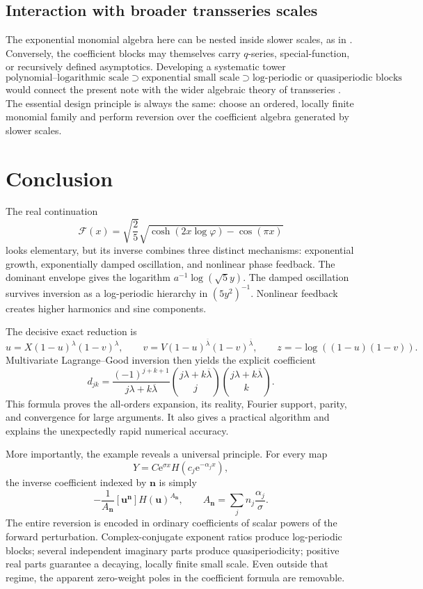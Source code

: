 \documentclass[11pt,oneside]{article}
\theoremstyle{plain}
\theoremstyle{definition}
\theoremstyle{remark}
\newcommand{\e}{\mathrm{e}}
\newcommand{\Fcal}{\mathcal{F}}
\newcommand{\phig}{\varphi}
\begin{document}
\subsection{Interaction with broader transseries scales}

The exponential monomial algebra here can be nested inside slower scales, as
in .  Conversely, the coefficient blocks may themselves
carry \(q\)-series, special-function, or recursively defined asymptotics.
Developing a systematic tower
\begin{equation}
 \text{polynomial--logarithmic scale}
 \supset
 \text{exponential small scale}
 \supset
 \text{log-periodic or quasiperiodic blocks}
 \label{eq:scale-tower}
\end{equation}
would connect the present note with the wider algebraic theory of transseries
\cite{vanderHoeven2006,Costin2009}.  The essential design principle is always
the same: choose an ordered, locally finite monomial family and perform
reversion over the coefficient algebra generated by slower scales.

\section{Conclusion}
\label{sec:conclusion}

The real continuation
\[
 \Fcal(x)=\sqrt{\frac25}
 \sqrt{\cosh(2x\log\phig)-\cos(\pi x)}
\]
looks elementary, but its inverse combines three distinct mechanisms:
exponential growth, exponentially damped oscillation, and nonlinear phase
feedback.  The dominant envelope gives the logarithm
\(a^{-1}\log(\sqrt5y)\).  The damped oscillation survives inversion as a
log-periodic hierarchy in \((5y^2)^{-1}\).  Nonlinear feedback creates higher
harmonics and sine components.

The decisive exact reduction is
\[
 u=X(1-u)^\lambda(1-v)^\lambda,
 \qquad
 v=V(1-u)^{\overline\lambda}(1-v)^{\overline\lambda},
 \qquad
 z=-\log((1-u)(1-v)).
\]
Multivariate Lagrange--Good inversion then yields the explicit coefficient
\[
 d_{jk}=\frac{(-1)^{j+k+1}}{j\lambda+k\overline\lambda}
 \binom{j\lambda+k\overline\lambda}{j}
 \binom{j\lambda+k\overline\lambda}{k}.
\]
This formula proves the all-orders expansion, its reality, Fourier support,
parity, and convergence for large arguments.  It also gives a practical
algorithm and explains the unexpectedly rapid numerical accuracy.

More importantly, the example reveals a universal principle.  For every map
\[
 Y=C\e^{\sigma x}H(c_j\e^{-\alpha_jx}),
\]
the inverse coefficient indexed by \(\bm n\) is simply
\[
 -\frac1{A_{\bm n}}[\bm u^{\bm n}]H(\bm u)^{A_{\bm n}},
 \qquad A_{\bm n}=\sum_jn_j\frac{\alpha_j}{\sigma}.
\]
The entire reversion is encoded in ordinary coefficients of scalar powers of
the forward perturbation.  Complex-conjugate exponent ratios produce
log-periodic blocks; several independent imaginary parts produce
quasiperiodicity; positive real parts guarantee a decaying, locally finite
small scale.  Even outside that regime, the apparent zero-weight poles in the
coefficient formula are removable.
\end{document}
